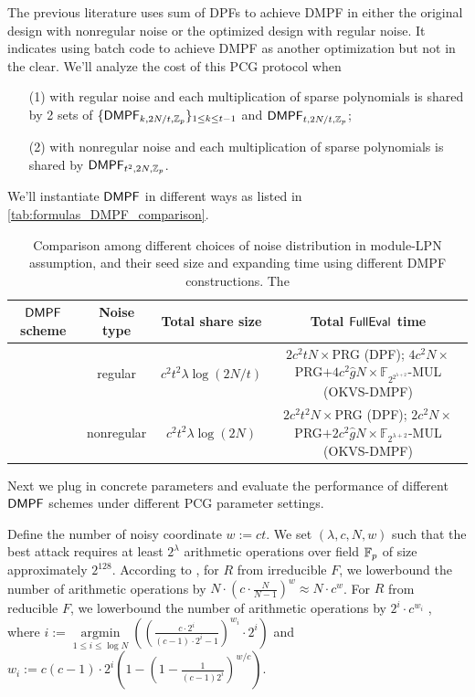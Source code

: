 The previous literature uses sum of DPFs to achieve DMPF in either the original design with nonregular noise or the optimized design with regular noise. It indicates using batch code to achieve DMPF as another optimization but not in the clear. We'll analyze the cost of this PCG protocol when 
\begin{itemize}
    \item[(1)]with regular noise and each multiplication of sparse polynomials is shared by 2 sets of $\{{\sf DMPF}_{k, 2N/t, \mathbb{Z}_p}\}_{1\le k\le t-1}$ and ${\sf DMPF}_{t, 2N/t, \mathbb{Z}_p}$;
    \item[(2)]with nonregular noise and each multiplication of sparse polynomials is shared by ${\sf DMPF}_{t^2, 2N, \mathbb{Z}_p}$. 
\end{itemize}
We'll instantiate ${\sf DMPF}$ in different ways as listed in \cref{tab:formulas_DMPF_comparison}. 
\begin{table}
    \caption{Comparison among different choices of noise distribution in module-LPN assumption, and their seed size and expanding time using different DMPF constructions. The }
	\label{tab:LPN_error_distribution}
		\begin{tabular}{cccc}
            \toprule
			${\sf DMPF}$ scheme & Noise type & Total share size & Total ${\sf FullEval}$ time \\
            \midrule
			 & regular & $c^2t^2\lambda\log(2N/t)$ & \makecell{$2c^2tN\times$PRG (DPF); \\ ${4c^2N}\times $PRG$+4c^2\hat{g}N\times \mathbb{F}_{2^{2^{\lambda+2}}}$-MUL (OKVS-DMPF)}\\
			 & nonregular & $c^2t^2\lambda\log(2N)$ &\makecell{ $2c^2t^2N\times$PRG (DPF); \\${2c^2N}\times$PRG$+2c^2\hat{g}N\times\mathbb{F}_{2^{\lambda+2}}$-MUL (OKVS-DMPF)}\\
            \bottomrule
		\end{tabular}
\end{table}

Next we plug in concrete parameters and evaluate the performance of different ${\sf DMPF}$ schemes under different PCG parameter settings. 

Define the number of noisy coordinate $w:=ct$. We set $(\lambda, c, N, w)$ such that the best attack requires at least $2^\lambda$ arithmetic operations over field $\mathbb{F}_p$ of size approximately $2^{128}$. According to \cite{cryptoeprint:2022/1035}, for $R$ from irreducible $F$, we lowerbound the number of arithmetic operations by $N\cdot (c\cdot \frac{N}{N-1})^w\approx N\cdot c^w$. For $R$ from reducible $F$, we lowerbound the number of arithmetic operations by $2^i\cdot c^{w_i}$ , where $i:=\mathop{\arg\min}\limits_{1\le i\le \log N}\left((\frac{c\cdot 2^i}{(c-1)\cdot 2^i-1})^{w_i}\cdot 2^i\right)$ and $w_i:=c(c-1)\cdot 2^i\left(1-(1-\frac{1}{(c-1)2^i})^{w/c}\right)$. 


